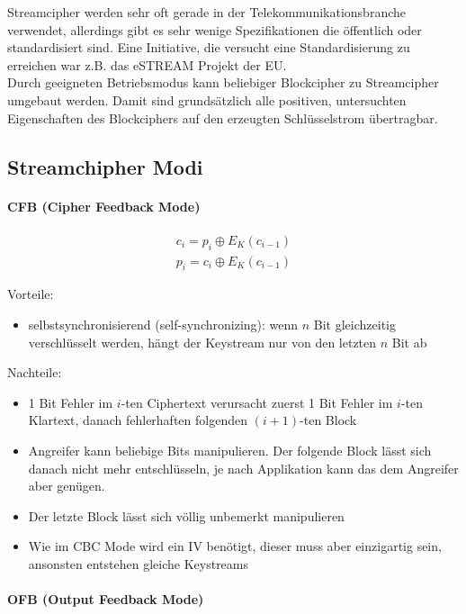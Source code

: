 \noindent Streamcipher werden sehr oft gerade in der Telekommunikationsbranche verwendet,
allerdings gibt es sehr wenige Spezifikationen die öffentlich oder standardisiert sind. Eine Initiative, die versucht eine Standardisierung zu erreichen war z.B. das
eSTREAM Projekt der EU. \\

\noindent Durch geeigneten Betriebsmodus kann beliebiger Blockcipher zu Streamcipher umgebaut werden. Damit sind grundsätzlich alle positiven, untersuchten Eigenschaften des
Blockciphers auf den erzeugten Schlüsselstrom übertragbar.

\subsection{Streamchipher Modi}

\paragraph{CFB (Cipher Feedback Mode)}

\begin{align*}
    c_i = p_i \oplus E_K(c_{i-1}) \\
    p_i = c_i \oplus E_K(c_{i-1})
\end{align*}

Vorteile: 
\begin{itemize}
    \item selbstsynchronisierend (self-synchronizing): wenn $n$ Bit gleichzeitig verschlüsselt werden, hängt der Keystream nur von den letzten $n$ Bit ab
\end{itemize}

Nachteile: 
\begin{itemize}
    \item 1 Bit Fehler im $i$-ten Ciphertext verursacht zuerst 1 Bit Fehler im $i$-ten Klartext, danach
fehlerhaften folgenden $(i+1)$-ten Block
    \item Angreifer kann beliebige Bits manipulieren. Der folgende Block lässt sich danach nicht
mehr entschlüsseln, je nach Applikation kann das dem Angreifer aber genügen. 
    \item Der letzte Block lässt sich völlig unbemerkt manipulieren
    \item Wie im CBC Mode wird ein IV benötigt, dieser muss aber einzigartig sein, ansonsten
entstehen gleiche Keystreams
\end{itemize}


\paragraph{OFB (Output Feedback Mode)}

